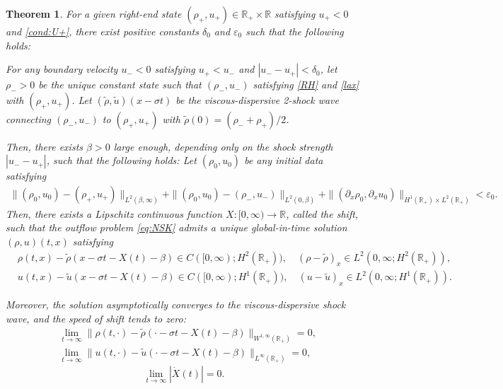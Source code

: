 \documentclass[11pt,reqno]{amsart}
\newtheorem{theorem}{Theorem}[section]
\numberwithin{equation}{section} %
\newcommand{\R}{\mathbb{R}}
\begin{document}
\begin{theorem}\label{thm:main}
For a given right-end state $(\rho_+, u_+) \in \mathbb{R}_+ \times \mathbb{R}$ satisfying $u_+ < 0$ and \eqref{cond:U+}, there exist positive constants $\delta_0$ and $\varepsilon_0$ such that the following holds:

For any boundary velocity $u_- < 0$ satisfying $u_+ < u_-$ and $|u_- - u_+| < \delta_0$, let $\rho_- > 0$ be the unique constant state such that $(\rho_-, u_-)$ satisfying \eqref{RH} and \eqref{lax} with $(\rho_+,u_+)$. Let $(\tilde{\rho}, \tilde{u})(x - \sigma t)$ be the viscous-dispersive 2-shock wave connecting $(\rho_-, u_-)$ to $(\rho_+, u_+)$ with $\tilde{\rho}(0)= (\rho_- + \rho_+)/2$.

Then, there exists $\beta > 0$ large enough, depending only on the shock strength $|u_- - u_+|$, such that the following holds: Let $(\rho_0, u_0)$ be any initial data satisfying
\begin{equation*}%
\begin{aligned}
    \|(\rho_0, u_0) - (\rho_+, u_+)\|_{L^2(\beta, \infty)} + \|(\rho_0, u_0) - (\rho_-, u_-)\|_{L^2(0, \beta)} + \|(\partial_x \rho_0, \partial_x u_0)\|_{H^1(\mathbb{R}_+) \times L^2(\mathbb{R}_+)} < \varepsilon_0.
\end{aligned}
\end{equation*}
Then, there exists a Lipschitz continuous function $X:[0,\infty)\to\R$, called the shift, such that the outflow problem \eqref{eq:NSK} admits a unique global-in-time solution $(\rho, u)(t,x)$ satisfying 
\begin{equation*}
    \begin{aligned}
    &\rho(t,x) - \tilde{\rho}(x - \sigma t - X(t) - \beta) \in C([0,\infty);H^2(\mathbb{R}_+)), \quad (\rho - \tilde{\rho})_x \in L^2(0,\infty;H^2(\mathbb{R}_+)),\\
    &u(t,x) - \tilde{u}(x - \sigma t - X(t) - \beta) \in C([0,\infty);H^1(\mathbb{R}_+)), \quad (u - \tilde{u})_x \in L^2(0,\infty;H^1(\mathbb{R}_+)).
\end{aligned}
\end{equation*}

Moreover, the solution asymptotically converges to the viscous-dispersive shock wave, and the speed of shift tends to zero:
\begin{equation}\label{asym-U}
	\begin{aligned}
	&\lim_{t\to\infty} \|\rho(t,\cdot)-\tilde{\rho}(\cdot-\sigma t-X(t)-\beta)\|_{W^{1,\infty}(\R_+)}=0,\\	
	&\lim_{t\to\infty} \|u(t,\cdot)-\tilde{u}(\cdot-\sigma t-X(t)-\beta)\|_{L^{\infty}(\R_+)}=0,
	\end{aligned}
\end{equation}
\begin{equation*}%
    \lim_{t \to \infty} |\dot{X}(t)| = 0.
\end{equation*}
\end{theorem}
\end{document}
